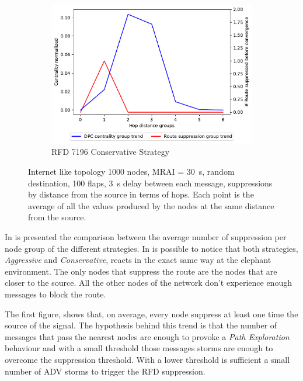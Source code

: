 \begin{figure}[h]
     \hfill
     \begin{subfigure}[b]{0.49\textwidth}
         \centering
         \includegraphics[width=\textwidth]{images/RFD/miceVSelephants/elephants/cisco_1000_RFD_7196_conservative_nodeConvergence_centVSsup_trend.pdf}
         \caption{RFD 7196 Conservative Strategy}
         \label{fig:1000_7196RFDC_cent_VS_sup_elephants}
     \end{subfigure}
		\caption{Internet like topology \num{1000} nodes, \ac{MRAI} = \SI{30}{\second},
		random destination, \num{100} flaps, \SI{3}{\second} delay between each
		message, suppressions by distance from the source in terms of hops.
		Each point is the average of all the values produced by the nodes at the
		same distance from the source.}
        \label{fig:1000_RFD_cent_VS_sup_elephants}
\end{figure}

In  is presented the comparison between
the average number of suppression per node group of the different strategies.
In 
is possible to notice that both strategies, \textit{Aggressive} and \textit{Conservative},
reacts in the exact same way at the elephant environment.
The only nodes that suppress the route are the nodes that are closer to the source.
All the other nodes of the network don't experience enough messages to block
the route.

The first figure,  shows
that, on average, every node suppress at least one time the source of the
signal.
The hypothesis behind this trend is that the number of messages that pass the
nearest nodes are enough to provoke a \textit{Path Exploration} behaviour and
with a small threshold those messages storms are enough to overcome the suppression
threshold.
With a lower threshold is sufficient a small number of \ac{ADV} storms
to trigger the \ac{RFD} suppression.

